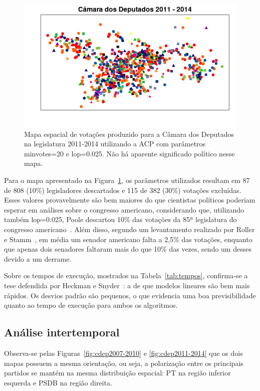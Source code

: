 \documentclass[
	article,			%
	12pt,				%
	oneside,			%
	a4paper,			%
	english,			%
	brazil,				%
	sumario=tradicional,
	oldfontcommands %
	]{abntex2}
\begin{document}
\begin{figure}[h!]
  \centering
  \includegraphics[scale=0.7]{figs/mapa-ruim.png}
  \caption{Mapa espacial de votações produzido para a Câmara dos Deputados na legislatura 2011-2014 utilizando a ACP com parâmetros \textsf{minvotes=20} e \textsf{lop=0.025}. Não há aparente significado político nesse mapa.}
  \label{fig:mapa-ruim}
\end{figure}

Para o mapa apresentado na Figura~\ref{fig:mapa-ruim}, os parâmetros utilizados resultam em 87 de 808 (10\%) legisladores descartados e 115 de 382 (30\%) votações excluídas. Esses valores provavelmente são bem maiores do que cientistas políticos poderiam esperar em análises sobre o congresso americano, considerando que, utilizando também \textsf{lop=0.025}, Poole descartou 10\% das votações da 85ª legislatura do congresso americano~\cite{poole1985nominate}. Além disso, segundo um levantamento realizado por Roller e Stamm~\cite{roller2014attendance}, em média um senador americano falta a 2,5\% das votações, enquanto que apenas dois senadores faltaram mais do que 10\% das vezes, sendo um desses devido a um derrame. 

Sobre os tempos de execução, mostrados na Tabela~\ref{tab:tempos}, confirma-se a tese defendida por Heckman e Snyder~\cite{heckman-snyder1997}: a de que modelos lineares são bem mais rápidos. Os desvios padrão são pequenos, o que evidencia uma boa previsibilidade quanto ao tempo de execução para ambos os algoritmos.

\subsection{Análise intertemporal}

Observa-se pelas Figuras~\ref{fig:cdep2007-2010} e \ref{fig:cdep2011-2014} que os dois mapas possuem a mesma orientação, ou seja, a polarização entre os principais partidos se mantém na mesma distribuição espacial: PT na região inferior esquerda e PSDB na região direita. 
\end{document}
